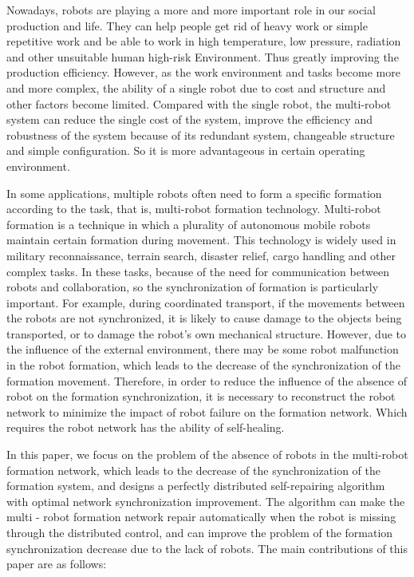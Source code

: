 \begin{englishabstract}
Nowadays, robots are playing a more and more important role in our social production and life. They can help people get rid of heavy work or simple repetitive work and be able to work in high temperature, low pressure, radiation and other unsuitable human high-risk Environment. Thus greatly improving the production efficiency. However, as the work environment and tasks become more and more complex, the ability of a single robot due to cost and structure and other factors become limited. Compared with the single robot, the multi-robot system can reduce the single cost of the system, improve the efficiency and robustness of the system because of its redundant system, changeable structure and simple configuration. So it is more advantageous in certain operating environment.

In some applications, multiple robots often need to form a specific formation according to the task, that is, multi-robot formation technology. Multi-robot formation is a technique in which a plurality of autonomous mobile robots maintain certain formation during movement. This technology is widely used in military reconnaissance, terrain search, disaster relief, cargo handling and other complex tasks. In these tasks, because of the need for communication between robots and collaboration, so the synchronization of formation is particularly important. For example, during coordinated transport, if the movements between the robots are not synchronized, it is likely to cause damage to the objects being transported, or to damage the robot's own mechanical structure. However, due to the influence of the external environment, there may be some robot malfunction in the robot formation, which leads to the decrease of the synchronization of the formation movement. Therefore, in order to reduce the influence of the absence of robot on the formation synchronization, it is necessary to reconstruct the robot network to minimize the impact of robot failure on the formation network. Which requires the robot network has the ability of self-healing.

In this paper, we focus on the problem of the absence of robots in the multi-robot formation network, which leads to the decrease of the synchronization of the formation system, and designs a perfectly distributed self-repairing algorithm with optimal network synchronization improvement. The algorithm can make the multi - robot formation network repair automatically when the robot is missing through the distributed control, and can improve the problem of the formation synchronization decrease due to the lack of robots. The main contributions of this paper are as follows:


\end{englishabstract}
